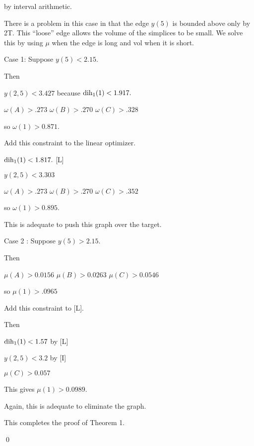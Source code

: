 by interval arithmetic.

There is a problem in this case in that the edge $y(5)$ is bounded above only by 2T.  This ``loose'' edge allows the volume of the simplices to be small.
We solve this by using $\mu$ when the edge is long and vol when it is short.

Case 1: Suppose $y(5)<2.15$.

Then 

$y(2,5)<3.427$ because $\operatorname{dih}_1(1)<1.917.$

$\omega(A)>.273$ \newline
$\omega(B)>.270$ \newline
$\omega(C)>.328$ \newline

so $\omega(1)>0.871.$  

Add this constraint to the linear optimizer.

$\operatorname{dih}_1(1)<1.817.$ [L]

$y(2,5)<3.303$

$\omega(A)>.273$ \newline
$\omega(B)>.270$ \newline
$\omega(C)>.352$ \newline

so $\omega(1)>0.895.$ 

This is adequate to push this graph over the target.

Case 2 : Suppose $y(5)>2.15.$

Then

$\mu(A)>0.0156$ \newline
$\mu(B)>0.0263$ \newline
$\mu(C)>0.0546$ \newline

so $\mu(1)>.0965$

Add this constraint to [L].

Then

$\operatorname{dih}_1(1)<1.57$ by [L]\newline

$y(2,5)<3.2$ by [I]\newline

$\mu(C)>0.057$ \newline

This gives $\mu(1)>0.0989.$

Again, this is adequate to eliminate the graph.

This completes the proof of Theorem 1.

\qed



